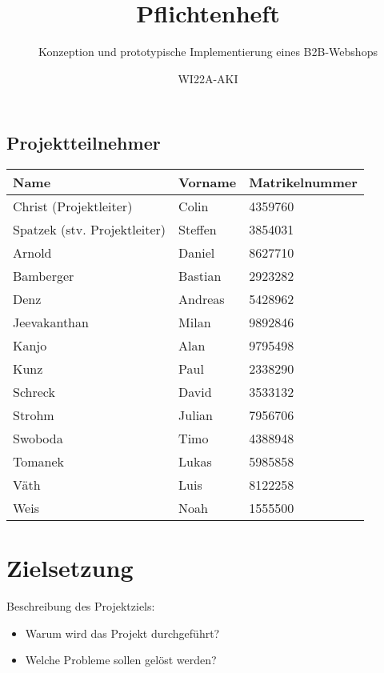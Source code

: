 \documentclass[%
	ngerman,
	12pt,
	a4paper
]{scrbook}
\title{Pflichtenheft}
\subtitle{Konzeption und prototypische Implementierung eines B2B-Webshops}
\author{WI22A-AKI}
\begin{document}
\maketitle

\section{Projektteilnehmer}
\begin{tabular}{l|l|l}
	\textbf{Name}                & \textbf{Vorname} & \textbf{Matrikelnummer} \\ \hline
	Christ (Projektleiter)       & Colin            & 4359760                 \\
	Spatzek (stv. Projektleiter) & Steffen          & 3854031                 \\ \hline
	Arnold                       & Daniel           & 8627710                 \\
	Bamberger                    & Bastian          & 2923282                 \\
	Denz                         & Andreas          & 5428962                 \\
	Jeevakanthan                 & Milan            & 9892846                 \\
	Kanjo                        & Alan             & 9795498                 \\
	Kunz                         & Paul             & 2338290                 \\
	Schreck                      & David            & 3533132                 \\
	Strohm                       & Julian           & 7956706                 \\
	Swoboda                      & Timo             & 4388948                 \\
	Tomanek                      & Lukas            & 5985858                 \\
	Väth                         & Luis             & 8122258                 \\
	Weis                         & Noah             & 1555500
\end{tabular}

\tableofcontents

\chapter{Zielsetzung}
Beschreibung des Projektziels:
\begin{itemize}
	\item Warum wird das Projekt durchgeführt?
	\item Welche Probleme sollen gelöst werden?
\end{itemize}
\end{document}
